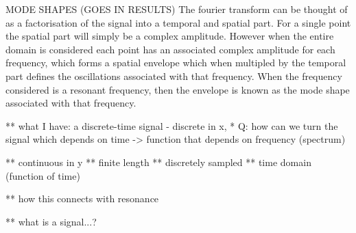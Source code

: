 MODE SHAPES (GOES IN RESULTS)
The fourier transform can be thought of as a factorisation of the signal into a
temporal and spatial part. For a single point the spatial part will simply be a
complex amplitude. However when the entire domain is considered each point has
an associated complex amplitude for each frequency, which forms a spatial
envelope which when multipled by the temporal part defines the oscillations
associated with that frequency. When the frequency considered is a resonant
frequency, then the envelope is known as the mode shape associated with that
frequency.

** what I have: a discrete-time signal - discrete in x,
* Q: how can we turn the signal which depends on time -> function that depends on frequency (spectrum)

** continuous in y
** finite length
** discretely sampled
** time domain (function of time)

** how this connects with resonance

** what is a signal...?

